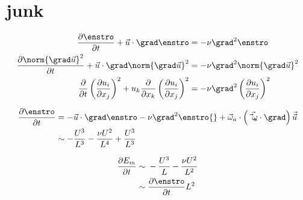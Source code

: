 \chapter{junk}



\begin{equation}\begin{split}
	\frac{\partial \enstro}{\partial t}
	+
	\vec{u} \cdot \grad \enstro
	&=
	-\nu \grad^{2} \enstro\\
	\frac{\partial \norm{\grad \vec{u}}^{2}}{\partial t}
	+
	\vec{u} \cdot \grad \norm{\grad \vec{u}}^{2}
	&=
	-\nu \grad^{2} \norm{\grad \vec{u}}^{2}\\
	\frac{\partial }{\partial t} \left(\frac{\partial u_{i}}{\partial x_{j}}\right)^{2}
	+
	u_{k}  \frac{\partial}{\partial x_{k}} \left(\frac{\partial u_{i}}{\partial x_{j}}\right)^{2}
	&=
	-\nu \grad^{2}  \left(\frac{\partial u_{i}}{\partial x_{j}}\right)^{2}\\
\end{split}\end{equation}


\begin{equation}\begin{split}
	\frac{\partial \enstro}{\partial t}
&=
	-
	\vec{u} \cdot \grad \enstro
	-\nu \grad^{2} \enstro{}
	+\vec{\omega}_{a}\cdot \left( \vec{\vec{\omega}_{a}} \cdot \grad \right) \vec{\vec{u}}\\
&\sim-
	\frac{U^{3}}{L^{3}}
	- \frac{\nu U^{2}}{L^{4}}
	+ \frac{U^{3}}{L^{3}}\\
\end{split}\end{equation}

\begin{equation}\begin{split}
	\frac{\partial E_{m}}{\partial t}
&\sim{}
-	\frac{U^{3}}{L}
	- \frac{\nu U^{2}}{L^{2}} \\
	&\sim
	\frac{\partial \enstro}{\partial t} L^{2}
\end{split}\end{equation}







